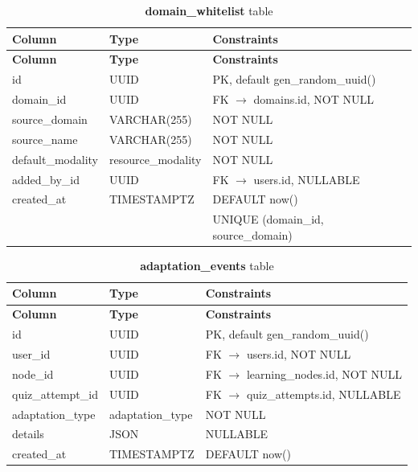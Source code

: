 \begin{longtable}{p{3cm}p{2.5cm}p{5cm}}
\caption{\textbf{domain\_whitelist} table}
\label{tab:ch04_domain_whitelist}\\
\toprule
\textbf{Column} & \textbf{Type} & \textbf{Constraints} \\
\midrule
\endfirsthead
\toprule
\textbf{Column} & \textbf{Type} & \textbf{Constraints} \\
\midrule
\endhead
id & UUID & PK, default gen\_random\_uuid() \\
domain\_id & UUID & FK $\rightarrow$ domains.id, NOT NULL \\
source\_domain & VARCHAR(255) & NOT NULL \\
source\_name & VARCHAR(255) & NOT NULL \\
default\_modality & resource\_modality & NOT NULL \\
added\_by\_id & UUID & FK $\rightarrow$ users.id, NULLABLE \\
created\_at & TIMESTAMPTZ & DEFAULT now() \\
 &  & UNIQUE (domain\_id, source\_domain) \\
\bottomrule
\end{longtable}

\begin{longtable}{p{3cm}p{2.5cm}p{5cm}}
\caption{\textbf{adaptation\_events} table}
\label{tab:ch04_adaptation_events}\\
\toprule
\textbf{Column} & \textbf{Type} & \textbf{Constraints} \\
\midrule
\endfirsthead
\toprule
\textbf{Column} & \textbf{Type} & \textbf{Constraints} \\
\midrule
\endhead
id & UUID & PK, default gen\_random\_uuid() \\
user\_id & UUID & FK $\rightarrow$ users.id, NOT NULL \\
node\_id & UUID & FK $\rightarrow$ learning\_nodes.id, NOT NULL \\
quiz\_attempt\_id & UUID & FK $\rightarrow$ quiz\_attempts.id, NULLABLE \\
adaptation\_type & adaptation\_type & NOT NULL \\
details & JSON & NULLABLE \\
created\_at & TIMESTAMPTZ & DEFAULT now() \\
\bottomrule
\end{longtable}

